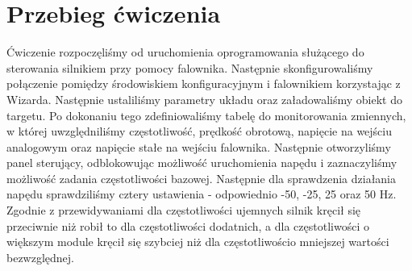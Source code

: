 \documentclass[a4paper, 12pt]{article}
\begin{document}
	\section{Przebieg ćwiczenia}
		Ćwiczenie rozpoczęliśmy od uruchomienia oprogramowania służącego do sterowania silnikiem przy pomocy falownika. Następnie skonfigurowaliśmy połączenie pomiędzy środowiskiem konfiguracyjnym i falownikiem korzystając z Wizarda. Następnie ustaliliśmy parametry układu oraz załadowaliśmy obiekt do targetu. Po dokonaniu tego zdefiniowaliśmy tabelę do monitorowania zmiennych, w której uwzględniliśmy częstotliwość, prędkość obrotową, napięcie na wejściu analogowym oraz napięcie stałe na wejściu falownika.
		\newline 
		\newline
		Następnie otworzyliśmy panel sterujący, odblokowując możliwość uruchomienia napędu i zaznaczyliśmy możliwość zadania częstotliwości bazowej. Następnie dla sprawdzenia działania napędu sprawdziliśmy cztery ustawienia - odpowiednio -50, -25, 25 oraz 50 Hz. Zgodnie z przewidywaniami dla częstotliwości ujemnych silnik kręcił się przeciwnie niż robił to dla częstotliwości dodatnich, a dla częstotliwości o większym module kręcił się szybciej niż dla częstotliwości\linebreak o mniejszej wartości bezwzględnej.
\end{document}
